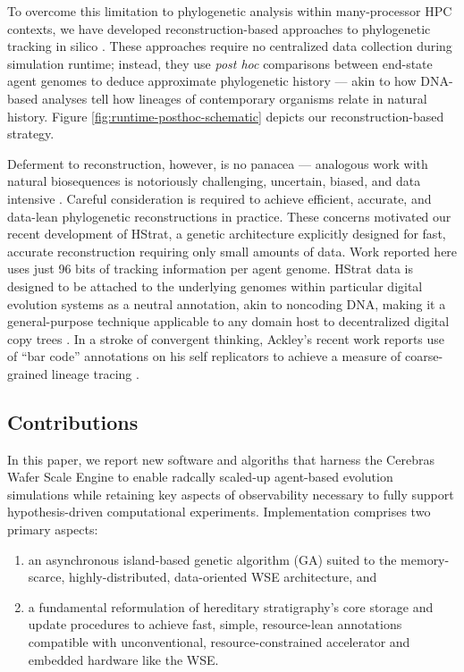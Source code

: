 To overcome this limitation to phylogenetic analysis within many-processor HPC contexts, we have developed reconstruction-based approaches to phylogenetic tracking in silico \citep{moreno2022hereditary}.
These approaches require no centralized data collection during simulation runtime; instead, they use \textit{post hoc} comparisons between end-state agent genomes to deduce approximate phylogenetic history --- akin to how DNA-based analyses tell how lineages of contemporary organisms relate in natural history.
Figure \ref{fig:runtime-posthoc-schematic} depicts our reconstruction-based strategy.

Deferment to reconstruction, however, is no panacea --- analogous work with natural biosequences is notoriously challenging, uncertain, biased, and data intensive \citep{TODOthatcitationfromabsractofpreprint}.
Careful consideration is required to achieve efficient, accurate, and data-lean phylogenetic reconstructions in practice.
These concerns motivated our recent development of HStrat, a genetic architecture explicitly designed for fast, accurate reconstruction requiring only small amounts of data.
Work reported here uses just 96 bits of tracking information per agent genome.
HStrat data is designed to be attached to the underlying genomes within particular digital evolution systems as a neutral annotation, akin to noncoding DNA, making it a general-purpose technique applicable to any domain host to decentralized digital copy trees \citep{FUNCITATIonsFRomPREPRINT}.
In a stroke of convergent thinking, Ackley's recent work reports use of ``bar code'' annotations on his self replicators to achieve a measure of coarse-grained lineage tracing \citep{ackley2023TODO}.

\subsection{Contributions}

In this paper, we report new software and algoriths that harness the Cerebras Wafer Scale Engine to enable radcally scaled-up agent-based evolution simulations while retaining key aspects of observability necessary to fully support hypothesis-driven computational experiments.
Implementation comprises two primary aspects:
\begin{enumerate}
  \item an asynchronous island-based genetic algorithm (GA) suited to the memory-scarce, highly-distributed, data-oriented WSE architecture, and
  \item a fundamental reformulation of hereditary stratigraphy's core storage and update procedures to achieve fast, simple, resource-lean annotations compatible with unconventional, resource-constrained accelerator and embedded hardware like the WSE.
\end{enumerate}


